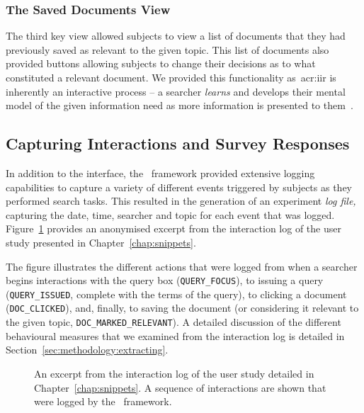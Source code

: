 \subsubsection{The Saved Documents View}\label{sec:methodology:user:interface:saved}
The third key view allowed subjects to view a list of documents that they had previously saved as relevant to the given topic. This list of documents also provided buttons allowing subjects to change their decisions as to what constituted a relevant document. We provided this functionality as~\gls{acr:iir} is inherently an interactive process -- a searcher \emph{learns} and develops their mental model of the given information need as more information is presented to them~\citep{ingwersen2005theturn}.

\subsection{Capturing Interactions and Survey Responses}\label{sec:methodology:user:capturing}
In addition to the interface, the \treconomics~framework provided extensive logging capabilities to capture a variety of different events triggered by subjects as they performed search tasks. This resulted in the generation of an experiment \emph{log file,} capturing the date, time, searcher and topic for each event that was logged. Figure~\ref{fig:log} provides an anonymised excerpt from the interaction log of the user study presented in Chapter~\ref{chap:snippets}.

The figure illustrates the different actions that were logged from when a searcher begins interactions with the query box (\texttt{QUERY\_FOCUS}), to issuing a query (\texttt{QUERY\_ISSUED}, complete with the terms of the query), to clicking a document (\texttt{DOC\_CLICKED}), and, finally, to saving the document (or considering it relevant to the given topic, \texttt{DOC\_MARKED\_RELEVANT}). A detailed discussion of the different behavioural measures that we examined from the interaction log is detailed in Section~\ref{sec:methodology:extracting}.

\begin{figure}[t!]
    \centering
    \caption[Experiment log file excerpt]{An excerpt from the interaction log of the user study detailed in Chapter~\ref{chap:snippets}. A sequence of interactions are shown that were logged by the \treconomics~framework.}
    \label{fig:log}
\end{figure}


